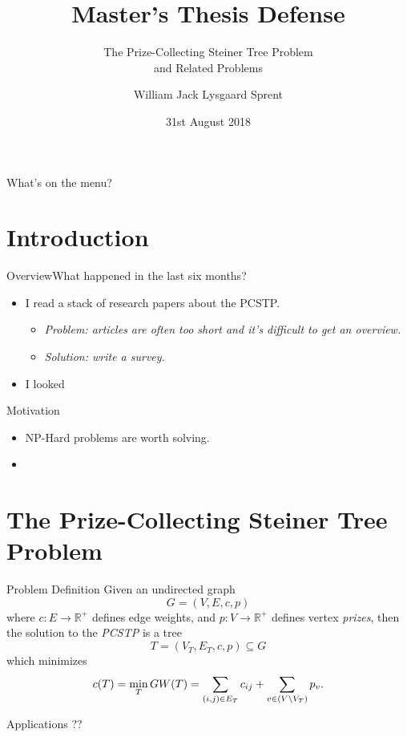 \documentclass[rgb,dvipsnames]{beamer}
\title{Master's Thesis Defense}
\subtitle{The Prize-Collecting Steiner Tree Problem
  \\and Related Problems}
\author{William Jack Lysgaard Sprent}
\date{31st August 2018}
\institute{DIKU}
\newcommand{\RR}{\mathbb{R}}      %
\begin{document}
\frame{\titlepage}

\begin{frame}{What's on the menu?}
\tableofcontents[pausesections]
\end{frame}

\section{Introduction}

\begin{frame}{Overview}{What happened in the last six months?}
  \begin{itemize}
  \item I read a stack of research papers about the PCSTP.
    \begin{itemize}
    \item \pause \textit{Problem: articles are often too short
        and it's difficult to get an overview.}
      \pause
    \item \textit{Solution: write a survey.}
    \end{itemize}
  \item I looked 
  \end{itemize}
\end{frame}

\begin{frame}{Motivation}
  \begin{itemize}
    \pause
  \item NP-Hard problems are worth solving.
    \pause
  \item 
  \end{itemize}
\end{frame}
\section{The Prize-Collecting Steiner Tree Problem}
\begin{frame}{Problem Definition}
 Given an undirected graph
\[G = (V, E, c, p)\]
where $c: E \to \RR^+$ defines edge weights,
and $p: V \to \RR^+$ defines vertex \textit{prizes}, then the solution to the
\textit{PCSTP} is a tree
\[T = (V_T, E_T, c, p) \subseteq G\]
which minimizes
\[c(T) = \min_T GW(T) = \sum_{(i,j) \in E_T} c_{ij} + \sum_{v\in (V \setminus V_T)} p_v \textnormal{.} \]
\end{frame}

\begin{frame}{Applications}
 ??  
\end{frame}
\end{document}
